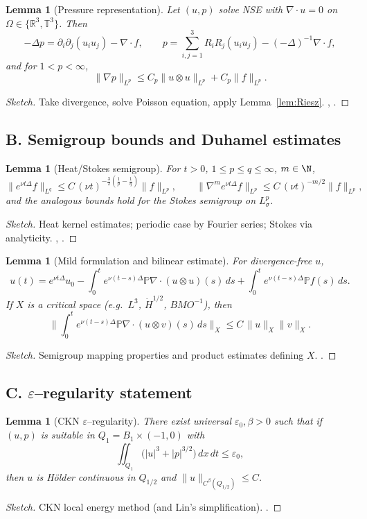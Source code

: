 \IfFileExists{nyjm.cls}{\documentclass[11pt]{nyjm}}{\documentclass[11pt]{amsart}}
\newcommand{\R}{\mathbb{R}}
\newcommand{\T}{\mathbb{T}}
\theoremstyle{plain}
\newtheorem{lemma}[theorem]{Lemma}
\theoremstyle{definition}
\theoremstyle{remark}
\begin{document}
\begin{lemma}[Pressure representation]\label{lem:pressure}
Let $(u,p)$ solve NSE with $\nabla\!\cdot u=0$ on $\Omega\in\{\R^3,\T^3\}$. Then
\[
-\Delta p=\partial_i\partial_j(u_i u_j)-\nabla\!\cdot f,\qquad
p=\sum_{i,j=1}^3 R_iR_j(u_i u_j)-(-\Delta)^{-1}\nabla\!\cdot f,
\]
and for $1<p<\infty$,
\[
\|\nabla p\|_{L^p}\le C_p\|u\otimes u\|_{L^p}+C_p\|f\|_{L^p}.
\]
\end{lemma}
\begin{proof}[Sketch]
Take divergence, solve Poisson equation, apply Lemma~\ref{lem:Riesz}. \cite[§I.3, §III.3]{Temam2001}, \cite[Thm.~2.3.1]{Sohr2001}.
\end{proof}

\subsection*{B. Semigroup bounds and Duhamel estimates}\label{app:SG}
\begin{lemma}[Heat/Stokes semigroup]\label{lem:heat}
For $t>0$, $1\le p\le q\le\infty$, $m\in\N$,
\[
\|e^{\nu t\Delta} f\|_{L^q}\le C\,(\nu t)^{-\frac{3}{2}\left(\frac1p-\frac1q\right)}\|f\|_{L^p},\qquad
\|\nabla^m e^{\nu t\Delta} f\|_{L^p}\le C\,(\nu t)^{-m/2}\|f\|_{L^p},
\]
and the analogous bounds hold for the Stokes semigroup on $L^p_\sigma$. 
\end{lemma}
\begin{proof}[Sketch]
Heat kernel estimates; periodic case by Fourier series; Stokes via analyticity. \cite[Ch.~3]{Temam2001}, \cite[Thm.~2.6]{Sohr2001}.
\end{proof}

\begin{lemma}[Mild formulation and bilinear estimate]\label{lem:duhamel}
For divergence-free $u$,
\[
u(t)=e^{\nu t\Delta}u_0-\int_0^t e^{\nu(t-s)\Delta}\mathbb P\nabla\!\cdot(u\otimes u)(s)\,ds+\int_0^t e^{\nu(t-s)\Delta}\mathbb P f(s)\,ds.
\]
If $X$ is a critical space (e.g.\ $L^3$, $\dot H^{1/2}$, $BMO^{-1}$), then
\[
\Big\|\int_0^t e^{\nu(t-s)\Delta}\mathbb P\nabla\!\cdot(u\otimes v)(s)\,ds\Big\|_{X}
\le C\,\|u\|_{X}\|v\|_{X}.
\]
\end{lemma}
\begin{proof}[Sketch]
Semigroup mapping properties and product estimates defining $X$. \cite{FujitaKato1964,Kato1984,KochTataru2001}.
\end{proof}

\subsection*{C. $\varepsilon$–regularity statement}\label{app:eps}
\begin{lemma}[CKN $\varepsilon$–regularity]\label{lem:ckn}
There exist universal $\varepsilon_0,\beta>0$ such that if $(u,p)$ is suitable in $Q_1=B_1\times(-1,0)$ with
\[
\iint_{Q_1}\big(|u|^3+|p|^{3/2}\big)\,dx\,dt\le \varepsilon_0,
\]
then $u$ is Hölder continuous in $Q_{1/2}$ and $\|u\|_{C^\beta(Q_{1/2})}\le C$.
\end{lemma}
\begin{proof}[Sketch]
CKN local energy method (and Lin’s simplification). \cite{CKN1982,Lin1998}.
\end{proof}
\end{document}
